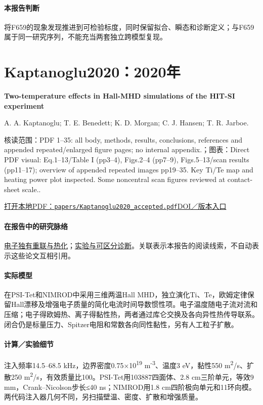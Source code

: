 \documentclass[UTF8,a4paper,11pt,openany,fontset=fandol]{ctexbook}
\begin{document}
\paragraph{本报告判断}将F659的现象发现推进到可检验标度，同时保留拟合、瞬态和诊断定义；与F659属于同一研究序列，不能充当两套独立跨模型复现。

\section{Kaptanoglu2020：2020年}\label{paper:Kaptanoglu2020}

\textbf{Two-temperature effects in Hall-MHD simulations of the HIT-SI experiment}\citep{Kaptanoglu2020}\

A. A. Kaptanoglu;  T. E. Benedett;  K. D. Morgan;  C. J. Hansen;  T. R. Jarboe.

\textsf{核读范围：}PDF 1–35: all body,  methods,  results,  conclusions,  references and appended repeated/enlarged figure pages;  no internal appendix.；\textsf{图表：}Direct PDF visual: Eq.1–13/Table I (pp3–4),  Figs.2–4 (pp7–9),  Figs.5–13/scan results (pp11–17);  overview of appended repeated images pp19–35. Key Ti/Te map and heating power plot inspected. Some noncentral scan figures reviewed at contact-sheet scale..

\href{run:../papers/Kaptanoglu2020_accepted.pdf}{打开本地PDF：\texttt{papers/Kaptanoglu2020\_accepted.pdf}}\quad\href{https://doi.org/10.1063/5.0006311}{DOI／版本入口}

\paragraph{在报告中的研究脉络}\hyperref[story:energy]{电子独有重联与热化}；\hyperref[story:diagnostic]{实验与可区分诊断}。关联表示本报告的阅读线索，不自动表示这些论文互相引用。

\paragraph{实际模型}在PSI-Tet和NIMROD中采用三维两温Hall MHD，独立演化Ti、Te，欧姆定律保留Hall漂移及增强电子质量的简化电流时间导数惯性项。电子温度随电子流对流和压缩；电子得欧姆热、离子得黏性热，两者通过库仑交换及各向异性热传导联系。闭合仍是标量压力、Spitzer电阻和常数各向同性黏性，另有人工粒子扩散。

\paragraph{计算／实验细节}注入频率14.5–68.5 kHz，边界密度0.75×10\textsuperscript{19} m\textsuperscript{-3}、温度3 eV，黏性550 m\textsuperscript{2}/s、扩散250 m\textsuperscript{2}/s，有效质量比100。PSI-Tet用103887四面体、2.8 cm三阶单元，等效9 mm，Crank–Nicolson步长≤40 ns；NIMROD用1.8 cm四阶极向单元和11环向模。两代码注入器几何不同，另扫描壁温、密度、扩散和增强质量。
\end{document}
